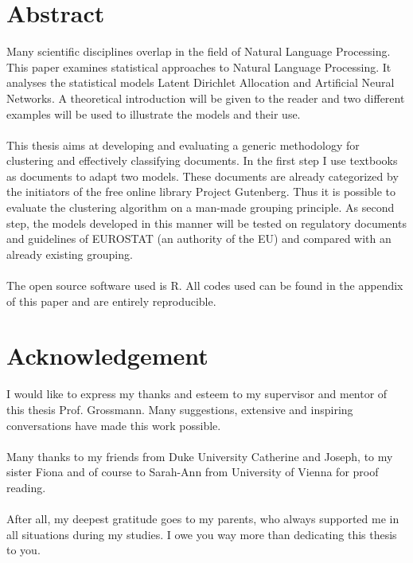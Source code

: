 \documentclass[11pt,a4paper]{article}
\author{Sebastian Knigge}
\begin{document}
\pagestyle{empty}	
	
	
\section*{Abstract}
Many scientific disciplines overlap in the field of Natural Language Processing. This paper examines statistical approaches to Natural Language Processing. It analyses the statistical models Latent Dirichlet Allocation and Artificial Neural Networks. A theoretical introduction will be given to the reader and two different examples will be used to illustrate the models and their use.\\
\ \\
This thesis aims at developing and evaluating a generic methodology for clustering and effectively classifying documents. In the first step I use textbooks as documents to adapt two models. These documents are already categorized by the initiators of the free online library Project Gutenberg. Thus it is possible to evaluate the clustering algorithm on a man-made grouping principle. As second step, the models developed in this manner will be tested on regulatory documents and guidelines of EUROSTAT (an authority of the EU) and compared with an already existing grouping.\\
\ \\
The open source software used is R. All codes used can be found in the appendix of this paper and are entirely reproducible.

	

\newpage

	
\section*{Acknowledgement}

I would like to express my thanks and esteem to my supervisor and mentor of this thesis Prof. Grossmann. Many suggestions, extensive and inspiring conversations have made this work possible.\\
\ \\
Many thanks to my friends from Duke University Catherine and Joseph, to my sister Fiona and of course to Sarah-Ann from University of Vienna for proof reading.\\
\ \\
After all, my deepest gratitude goes to my parents, who always supported me in all situations during my studies. I owe you way more than dedicating this thesis to you.
\end{document}
